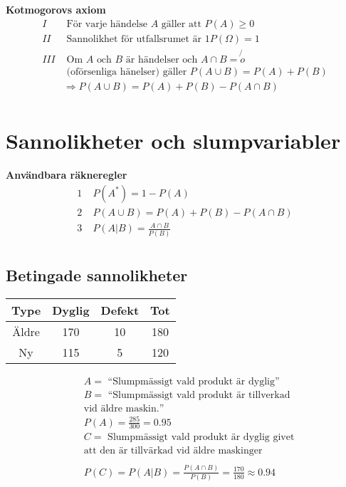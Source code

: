 \begin{multicols}{2}
\textbf{Kotmogorovs axiom}
\begin{align*}
  I &\text{ För varje händelse $A$ gäller att } P(A) \geq 0 \\
  II &\text{ Sannolikhet för utfallsrumet är } 1 P(\Omega)=1 \\
  III &\text{ Om $A$ och $B$ är händelser och } A\cap{B}=\not{o} \\
  &\text{ (oförsenliga hänelser) gäller } P(A\cup{B}) = P(A) + P(B) \\
  &\Rightarrow P(A\cup{B})=P(A)+P(B)-P(A\cap{B}) \\
\end{align*}

\newpage

\section{Sannolikheter och slumpvariabler}
\textbf{Användbara räkneregler}
\begin{align*}
  1 \; &P(A^*) = 1-P(A) \\
  2 \; &P(A\cup{B}) = P(A)+P(B)-P(A\cap{B}) \\
  3 \; &P(A|B) = \frac{A\cap{B}}{P(B)} \\
\end{align*}

\subsection{Betingade sannolikheter}
\begin{center}
\begin{tabular}{|c|c|c|c|}
 \hline
 Type & Dyglig & Defekt & Tot \\
 \hline
 Äldre & 170 & 10 & 180 \\
 \hline
 Ny & 115 & 5 & 120 \\
 \hline
\end{tabular}
\end{center}
\begin{align*}
  &A = \text{ ``Slumpmässigt vald produkt är dyglig'' } \\
  &B = \text{ ``Slumpmässigt vald produkt är tillverkad} \\
  &\text{vid äldre maskin.''} \\
  &P(A) = \frac{285}{300} = 0.95 \\
  &C = \text{ Slumpmässigt vald produkt är dyglig givet} \\
  &\text{att den är tillvärkad vid äldre maskinger } \\
  &\\
  &P(C) = P(A|B) = \frac{P(A\cap{B})}{P(B)} = \frac{170}{180} \approx 0.94 \\
\end{align*}


\end{multicols}
